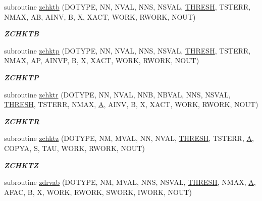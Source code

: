 \begin{DoxyCompactItemize}
subroutine \hyperlink{group__complex16__lin_ga95fafa4b528b3978bacb84d5b0a4645a}{zchktb} (D\+O\+T\+Y\+P\+E, N\+N, N\+V\+A\+L, N\+N\+S, N\+S\+V\+A\+L, \hyperlink{zlaqgs_8c_a0656018abfc9fa2821827415f5d5ea57}{T\+H\+R\+E\+S\+H}, T\+S\+T\+E\+R\+R, N\+M\+A\+X, A\+B, A\+I\+N\+V, B, X, X\+A\+C\+T, W\+O\+R\+K, R\+W\+O\+R\+K, N\+O\+U\+T)
\begin{DoxyCompactList}\small\item\em {\bfseries Z\+C\+H\+K\+T\+B} \end{DoxyCompactList}\item 
subroutine \hyperlink{group__complex16__lin_ga1df5aa34783d6231594835e0f8e2d35d}{zchktp} (D\+O\+T\+Y\+P\+E, N\+N, N\+V\+A\+L, N\+N\+S, N\+S\+V\+A\+L, \hyperlink{zlaqgs_8c_a0656018abfc9fa2821827415f5d5ea57}{T\+H\+R\+E\+S\+H}, T\+S\+T\+E\+R\+R, N\+M\+A\+X, A\+P, A\+I\+N\+V\+P, B, X, X\+A\+C\+T, W\+O\+R\+K, R\+W\+O\+R\+K, N\+O\+U\+T)
\begin{DoxyCompactList}\small\item\em {\bfseries Z\+C\+H\+K\+T\+P} \end{DoxyCompactList}\item 
subroutine \hyperlink{group__complex16__lin_ga02ea73af4c37a9504c443c5e8ecaf5f1}{zchktr} (D\+O\+T\+Y\+P\+E, N\+N, N\+V\+A\+L, N\+N\+B, N\+B\+V\+A\+L, N\+N\+S, N\+S\+V\+A\+L, \hyperlink{zlaqgs_8c_a0656018abfc9fa2821827415f5d5ea57}{T\+H\+R\+E\+S\+H}, T\+S\+T\+E\+R\+R, N\+M\+A\+X, \hyperlink{classA}{A}, A\+I\+N\+V, B, X, X\+A\+C\+T, W\+O\+R\+K, R\+W\+O\+R\+K, N\+O\+U\+T)
\begin{DoxyCompactList}\small\item\em {\bfseries Z\+C\+H\+K\+T\+R} \end{DoxyCompactList}\item 
subroutine \hyperlink{group__complex16__lin_ga5f40902e63b27350af56bbae86cf0749}{zchktz} (D\+O\+T\+Y\+P\+E, N\+M, M\+V\+A\+L, N\+N, N\+V\+A\+L, \hyperlink{zlaqgs_8c_a0656018abfc9fa2821827415f5d5ea57}{T\+H\+R\+E\+S\+H}, T\+S\+T\+E\+R\+R, \hyperlink{classA}{A}, C\+O\+P\+Y\+A, S, T\+A\+U, W\+O\+R\+K, R\+W\+O\+R\+K, N\+O\+U\+T)
\begin{DoxyCompactList}\small\item\em {\bfseries Z\+C\+H\+K\+T\+Z} \end{DoxyCompactList}\item 
subroutine \hyperlink{group__complex16__lin_ga3f33f42c1c145588a2a66c4cd2441181}{zdrvab} (D\+O\+T\+Y\+P\+E, N\+M, M\+V\+A\+L, N\+N\+S, N\+S\+V\+A\+L, \hyperlink{zlaqgs_8c_a0656018abfc9fa2821827415f5d5ea57}{T\+H\+R\+E\+S\+H}, N\+M\+A\+X, \hyperlink{classA}{A}, A\+F\+A\+C, B, X, W\+O\+R\+K, R\+W\+O\+R\+K, S\+W\+O\+R\+K, I\+W\+O\+R\+K, N\+O\+U\+T)

\end{DoxyCompactItemize}
